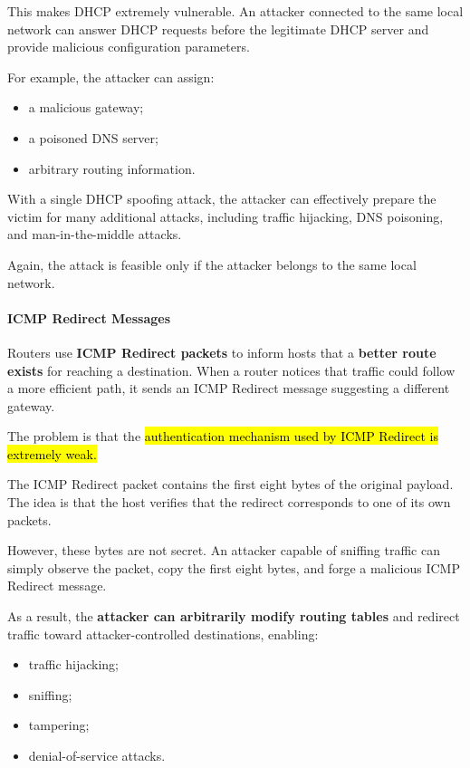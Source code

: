 \documentclass{article}
\begin{document}
This makes DHCP extremely vulnerable. An attacker connected to the same
local network can answer DHCP requests before the legitimate DHCP server
and provide malicious configuration parameters.

For example, the attacker can assign:

\begin{itemize}
\item a malicious gateway;
\item a poisoned DNS server;
\item arbitrary routing information.
\end{itemize}

With a single DHCP spoofing attack, the attacker can effectively prepare
the victim for many additional attacks, including traffic hijacking, DNS
poisoning, and man-in-the-middle attacks.

Again, the attack is feasible only if the attacker belongs to the same
local network.

\paragraph{ICMP Redirect Messages}

Routers use \textbf{ICMP Redirect packets} to inform hosts that a \textbf{better
route exists} for reaching a destination. When a router notices that
traffic could follow a more efficient path, it sends an ICMP Redirect
message suggesting a different gateway.

The problem is that the \hl{authentication mechanism used by ICMP Redirect
is extremely weak.}

The ICMP Redirect packet contains the first eight bytes of the original
payload. The idea is that the host verifies that the redirect
corresponds to one of its own packets.

However, these bytes are not secret. An attacker capable of sniffing
traffic can simply observe the packet, copy the first eight bytes, and
forge a malicious ICMP Redirect message.

As a result, the \textbf{attacker can arbitrarily modify routing tables} and
redirect traffic toward attacker-controlled destinations, enabling:

\begin{itemize}
\item traffic hijacking;
\item sniffing;
\item tampering;
\item denial-of-service attacks.
\end{itemize}
\end{document}
